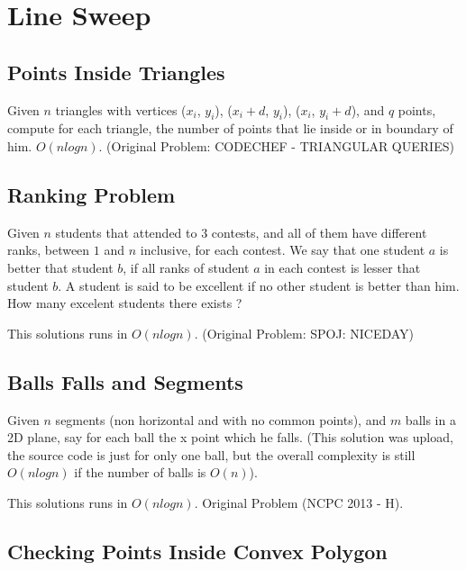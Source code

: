         
    \section{Line Sweep}
        \subsection{Points Inside Triangles}
        Given $n$ triangles with vertices {($x_i$, $y_i$), ($x_i + d$, $y_i$), ($x_i$, $y_i + d$)}, and $q$ points, compute for each triangle, the number of points that lie inside or in boundary of him. $O(nlogn)$. (Original Problem: CODECHEF - TRIANGULAR QUERIES)
        \newpage
        \subsection{Ranking Problem}
        Given $n$ students that attended to $3$ contests, and all of them have different ranks, between $1$ and $n$ inclusive, for each contest. We say that one student $a$ is better that student $b$, if all ranks of student $a$ in each contest is lesser that student $b$. A student is said to be excellent if no other student is better than him. How many excelent students there exists ?
        
        This solutions runs in $O(nlogn)$. (Original Problem: SPOJ: NICEDAY)
        
        \newpage
        \subsection{Balls Falls and Segments}
        Given $n$ segments (non horizontal and with no common points), and $m$ balls in a 2D plane, say for each ball the x point which he falls. (This solution was upload, the source code is just for only one ball, but the overall complexity is still $O(nlogn)$ if the number of balls is $O(n)$).
        
        This solutions runs in $O(nlogn)$. Original Problem (NCPC 2013 - H).
        
        \newpage
        \subsection{Checking Points Inside Convex Polygon}
            
